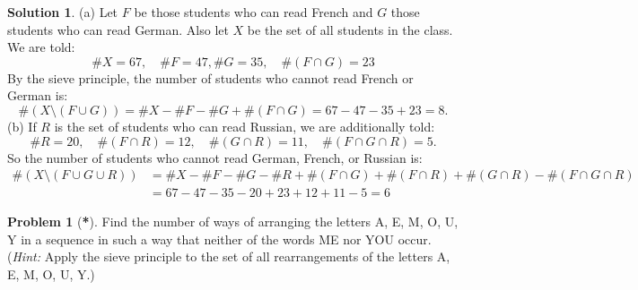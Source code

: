 \documentclass{article}
\numberwithin{equation}{section}
\theoremstyle{plain}
\theoremstyle{definition}
\newtheorem{problem}{Problem}
\newtheorem*{solution*}{Solution}
\begin{document}
\begin{solution*}
	(a) Let $F$ be those students who can read French and $G$ those students who can read German. Also let $X$ be the set of all students in the class. We are told: \[
	\#X = 67, \quad \#F = 47, \#G = 35, \quad \#(F \cap G) = 23
	\]
	By the sieve principle, the number of students who cannot read French or German is:
	\[
	\#(X \setminus(F \cup G)) = \#X - \#F - \#G + \#(F \cap G) = 67 - 47 - 35 + 23 = \boxed{8}.
	\]
	(b) If $R$ is the set of students who can read Russian, we are additionally told: 
	\[
	\#R = 20, \quad \#(F \cap R) = 12, \quad \#(G \cap R) = 11, \quad \#(F \cap G \cap R) = 5.
	\]
	So the number of students who cannot read German, French, or Russian is:
	\begin{align*}
	\#(X \setminus(F \cup G \cup R)) &= \#X - \#F - \#G - \#R + \#(F \cap G) + \#(F \cap R) + \#(G \cap R) - \#(F \cap G \cap R) \\
	&= 67 - 47 - 35 - 20 + 23 + 12 + 11 - 5 = \boxed{6}
	\end{align*}
\end{solution*}

\begin{problem}[\textbf{*}]
	Find the number of ways of arranging the letters A, E, M, O, U, Y in a sequence in such a way that neither of the words ME nor YOU occur. (\emph{Hint:} Apply the sieve principle to the set of all rearrangements of the letters A, E, M, O, U, Y.)
\end{problem}
\end{document}
